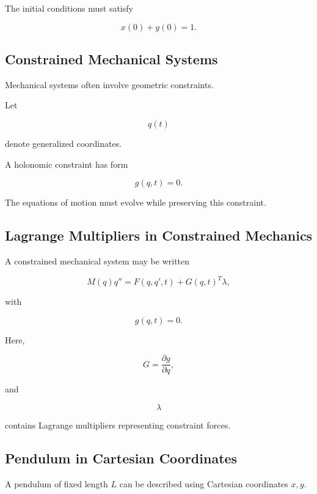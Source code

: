 The initial conditions must satisfy

\[
\boxed{
x(0)+y(0)=1.
}
\]

\subsection{Constrained Mechanical Systems}
\label{subsec:constrained-mechanical-systems-dae}

Mechanical systems often involve geometric constraints.

Let

\[
q(t)
\]

denote generalized coordinates.

A holonomic constraint has form

\[
\boxed{
g(q,t)=0.
}
\]

The equations of motion must evolve while preserving this constraint.

\subsection{Lagrange Multipliers in Constrained Mechanics}
\label{subsec:dae-lagrange-multipliers}

A constrained mechanical system may be written

\[
\boxed{
M(q)q''
=
F(q,q',t)
+
G(q,t)^T\lambda,
}
\]

with

\[
\boxed{
g(q,t)=0.
}
\]

Here,

\[
G
=
\frac{\partial g}{\partial q},
\]

and

\[
\lambda
\]

contains Lagrange multipliers representing constraint forces.

\subsection{Pendulum in Cartesian Coordinates}
\label{subsec:pendulum-cartesian-dae}

A pendulum of fixed length \(L\) can be described using Cartesian
coordinates \(x,y\).

